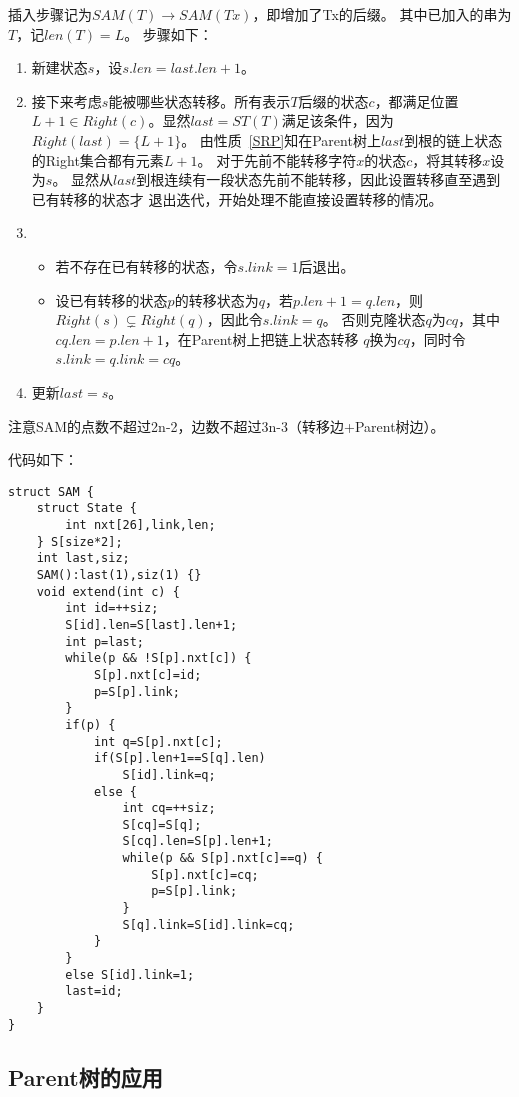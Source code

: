 插入步骤记为$SAM(T)\rightarrow SAM(Tx)$，即增加了Tx的后缀。
其中已加入的串为$T$，记$len(T)=L$。
步骤如下：
\begin{enumerate}
    \item 新建状态$s$，设$s.len=last.len+1$。
    \item 接下来考虑$s$能被哪些状态转移。所有表示$T$后缀的状态$c$，都满足位置
    $L+1 \in Right(c)$。显然$last=ST(T)$满足该条件，因为$Right(last)=\{L+1\}$。
    由性质~\ref{SRP}知在Parent树上$last$到根的链上状态的Right集合都有元素$L+1$。
    对于先前不能转移字符$x$的状态$c$，将其转移$x$设为$s$。
    显然从$last$到根连续有一段状态先前不能转移，因此设置转移直至遇到已有转移的状态才
    退出迭代，开始处理不能直接设置转移的情况。
    \item \begin{itemize}
        \item 若不存在已有转移的状态，令$s.link=1$后退出。
        \item 设已有转移的状态$p$的转移状态为$q$，若$p.len+1=q.len$，则
        $Right(s)\subsetneq Right(q)$，因此令$s.link=q$。
        否则克隆状态$q$为$cq$，其中$cq.len=p.len+1$，在Parent树上把链上状态转移
        $q$换为$cq$，同时令$s.link=q.link=cq$。
    \end{itemize}
    \item 更新$last=s$。
\end{enumerate}
注意SAM的点数不超过2n-2，边数不超过3n-3（转移边+Parent树边）。

代码如下：
\begin{lstlisting}
struct SAM {
    struct State {
        int nxt[26],link,len;
    } S[size*2];
    int last,siz;
    SAM():last(1),siz(1) {}
    void extend(int c) {
        int id=++siz;
        S[id].len=S[last].len+1;
        int p=last;
        while(p && !S[p].nxt[c]) {
            S[p].nxt[c]=id;
            p=S[p].link;
        }
        if(p) {
            int q=S[p].nxt[c];
            if(S[p].len+1==S[q].len)
                S[id].link=q;
            else {
                int cq=++siz;
                S[cq]=S[q];
                S[cq].len=S[p].len+1;
                while(p && S[p].nxt[c]==q) {
                    S[p].nxt[c]=cq;
                    p=S[p].link;
                }
                S[q].link=S[id].link=cq;
            }
        }
        else S[id].link=1;
        last=id;
    }
}
\end{lstlisting}
\subsection{Parent树的应用}
